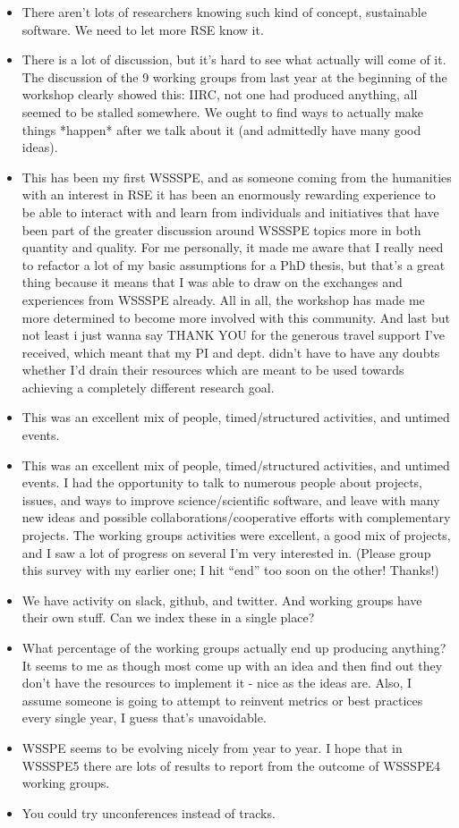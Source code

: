 \begin{itemize}
\item There aren't lots of researchers knowing such kind of concept, sustainable software. We need to let more RSE know it.
\item There is a lot of discussion, but it's hard to see what actually will come of it. The discussion of the 9 working groups from last year at the beginning of the workshop clearly showed this: IIRC, not one had produced anything, all seemed to be stalled somewhere. We ought to find ways to actually make things *happen* after we talk about it (and admittedly have many good ideas).
\item This has been my first WSSSPE, and as someone coming from the humanities with an interest in RSE it has been an enormously rewarding experience to be able to interact with and learn from individuals and initiatives that have been part of the greater discussion around WSSSPE topics more in both quantity and quality. For me personally, it made me aware that I really need to refactor a lot of my basic assumptions for a PhD thesis, but that's a great thing because it means that I was able to draw on the exchanges and experiences from WSSSPE already. All in all, the workshop has made me more determined to become more involved with this community. And last but not least i just wanna say THANK YOU for the generous travel support I've received, which meant that my PI and dept. didn't have to have any doubts whether I'd drain their resources which are meant to be used towards achieving a completely different research goal.
\item This was an excellent mix of people, timed/structured activities, and untimed events.
\item This was an excellent mix of people, timed/structured activities, and untimed events. I had the opportunity to talk to numerous people about projects, issues, and ways to improve science/scientific software, and leave with many new ideas and possible collaborations/cooperative efforts with complementary projects. The working groups activities were excellent, a good mix of projects, and I saw a lot of progress on several I'm very interested in. (Please group this survey with my earlier one; I hit ``end'' too soon on the other! Thanks!)
\item We have activity on slack, github, and twitter. And working groups have their own stuff. Can we index these in a single place?
\item What percentage of the working groups actually end up producing anything? It seems to me as though most come up with an idea and then find out they don't have the resources to implement it - nice as the ideas are. Also, I assume someone is going to attempt to reinvent metrics or best practices every single year, I guess that's unavoidable.
\item WSSPE seems to be evolving nicely from year to year.  I hope that in WSSSPE5 there are lots of results to report from the outcome of WSSSPE4 working groups.
\item You could try unconferences instead of tracks.
\end{itemize}
